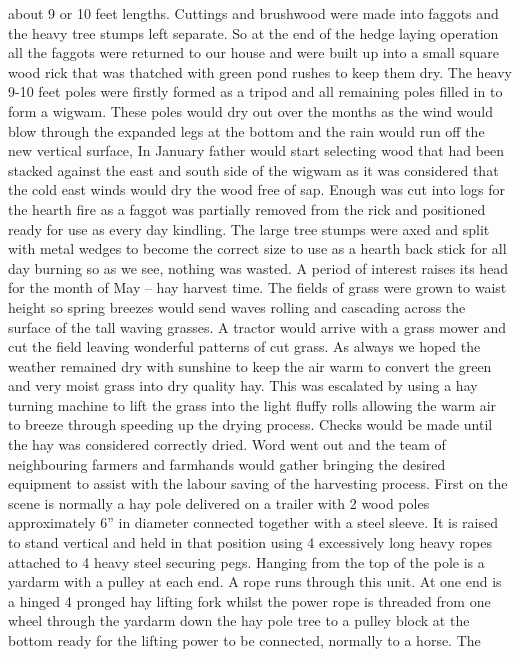 about 9 or 10 feet lengths.  Cuttings and brushwood were made into faggots and
the heavy tree stumps left separate.  So at the end of the hedge laying
operation all the faggots were returned to our house and were built up into a
small square wood rick that was thatched with green pond rushes to keep them
dry.  The heavy 9-10 feet poles were firstly formed as a tripod and all
remaining poles filled in to form a wigwam.  These poles would dry out over the
months as the wind would blow through the expanded legs at the bottom and the
rain would run off the new vertical surface, In January father would start
selecting wood that had been stacked against the east and south side of the
wigwam as it was considered that the cold east winds would dry the wood free of
sap.  Enough was cut into logs for the hearth fire as a faggot was partially
removed from the rick and positioned ready for use as every day kindling.  The
large tree stumps were axed and split with metal wedges to become the correct
size to use as a hearth back stick for all day burning so as we see, nothing
was wasted. A period of interest raises its head for the month of May – hay
harvest time.  The fields of grass were grown to waist height so spring breezes
would send waves rolling and cascading across the surface of the tall waving
grasses.   A tractor would arrive with a grass mower and cut the field leaving
wonderful patterns of cut grass.  As always we hoped the weather remained dry
with sunshine to keep the air warm to convert the green and very moist grass
into dry quality hay.  This was escalated by using a hay turning machine to
lift the grass into the light fluffy rolls allowing the warm air to breeze
through speeding up the drying process.  Checks would be made until the hay was
considered correctly dried.   Word went out and the team of neighbouring
farmers and farmhands would gather bringing the desired equipment to assist
with the labour saving of the harvesting process.  First on the scene is
normally a hay pole delivered on a trailer with 2 wood poles approximately 6''
in diameter connected together with a steel sleeve.  It is raised to stand
vertical and held in that position using 4 excessively long heavy ropes
attached to 4 heavy steel securing pegs.  Hanging from the top of the pole is a
yardarm with a pulley at each end.  A rope runs through this unit.   At one end
is a hinged 4 pronged hay lifting fork whilst the power rope is threaded from
one wheel through the yardarm down the hay pole tree to a pulley block at the
bottom ready for the lifting power to be connected, normally to a horse.  The
